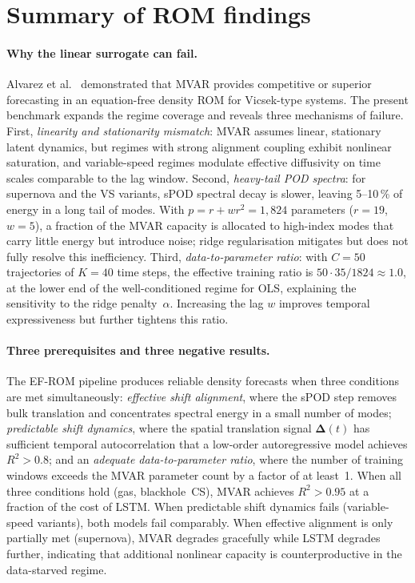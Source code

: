 \section{Summary of ROM findings}
\label{sec:ch7_summary}

\paragraph{Why the linear surrogate can fail.}
\label{sec:ch7_mvar_failure}

Alvarez et al.~\cite{alvarez2025eqfree} demonstrated that MVAR provides
competitive or superior forecasting in an equation-free density ROM for
Vicsek-type systems.  The present benchmark expands the regime coverage
and reveals three mechanisms of failure.
%
First, \emph{linearity and stationarity mismatch}: MVAR assumes linear,
stationary latent dynamics, but regimes with strong alignment coupling
exhibit nonlinear saturation, and variable-speed regimes modulate effective
diffusivity on time scales comparable to the lag window.
%
Second, \emph{heavy-tail POD spectra}: for supernova and the VS variants,
sPOD spectral decay is slower, leaving 5--10\,\% of energy in a long tail of
modes.  With $p = r + wr^2 = 1{,}824$ parameters ($r{=}19$, $w{=}5$),
a fraction of the MVAR capacity is allocated to high-index modes that carry
little energy but introduce noise; ridge regularisation mitigates but does
not fully resolve this inefficiency.
%
Third, \emph{data-to-parameter ratio}: with $C{=}50$ trajectories of
$K{=}40$ time steps, the effective training ratio is
$50 \cdot 35 / 1824 \approx 1.0$, at the lower end of the well-conditioned
regime for OLS, explaining the sensitivity to the ridge penalty~$\alpha$.
Increasing the lag $w$ improves temporal expressiveness but further tightens
this ratio.

\paragraph{Three prerequisites and three negative results.}

The EF-ROM pipeline produces reliable density forecasts when three
conditions are met simultaneously:
\emph{effective shift alignment}, where the sPOD step removes bulk
translation and concentrates spectral energy in a small number of modes;
\emph{predictable shift dynamics}, where the spatial translation signal
$\boldsymbol{\Delta}(t)$ has sufficient temporal autocorrelation that
a low-order autoregressive model achieves $R^2>0.8$; and an
\emph{adequate data-to-parameter ratio}, where the number of training
windows exceeds the MVAR parameter count by a factor of at least~1.
When all three conditions hold (gas, blackhole~CS), MVAR achieves
$R^2>0.95$ at a fraction of the cost of LSTM\@.  When predictable shift
dynamics fails (variable-speed variants), both models fail comparably.  When
effective alignment is only partially met (supernova), MVAR degrades gracefully
while LSTM degrades further, indicating that additional nonlinear
capacity is counterproductive in the data-starved regime.

